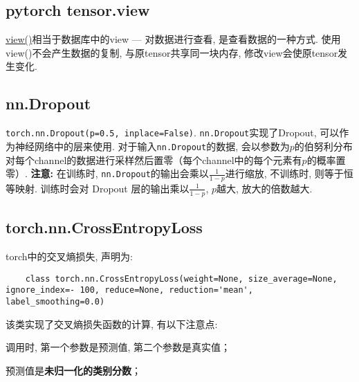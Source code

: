 \subsection{pytorch tensor.view}
\href{https://pytorch.org/docs/stable/tensor_view.html}{view()}相当于数据库中的view --- 对数据进行查看, 是查看数据的一种方式. 使用view()不会产生数据的复制, 与原tensor共享同一块内存, 修改view会使原tensor发生变化. 

\subsection{nn.Dropout}\label{nn_dropout}
\texttt{torch.nn.Dropout(p=0.5, inplace=False)}. \texttt{nn.Dropout}实现了Dropout, 可以作为神经网络中的层来使用. 对于输入\texttt{nn.Dropout}的数据, 会以参数为$p$的伯努利分布对每个channel的数据进行采样然后置零（每个channel中的每个元素有$p$的概率置零）. \textbf{注意: }在训练时, \texttt{nn.Dropout}的输出会乘以$\frac{1}{1 - p}$进行缩放, 不训练时, 则等于恒等映射. 训练时会对 Dropout 层的输出乘以$\frac{1}{1 - p}$, $p$越大, 放大的倍数越大. 

\subsection{torch.nn.CrossEntropyLoss}
torch中的交叉熵损失, 声明为: 
\begin{verbatim}
	class torch.nn.CrossEntropyLoss(weight=None, size_average=None, ignore_index=- 100, reduce=None, reduction='mean', label_smoothing=0.0)
\end{verbatim}

该类实现了交叉熵损失函数的计算, 有以下注意点: 
\begin{myitemize}
	\item 调用时, 第一个参数是预测值, 第二个参数是真实值；
	\item 预测值是\textbf{未归一化的类别分数}；
\end{myitemize}
